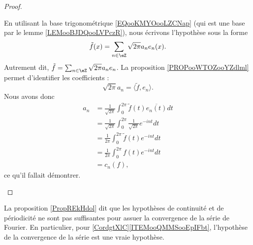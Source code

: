 \begin{proof}
\begin{subproof}
            En utilisant la base trigonométrique \eqref{EQooKMYOooLZCNap} (qui est une base par le lemme \ref{LEMooBJDQooLVPczR}), nous écrivons l'hypothèse sous la forme
            \begin{equation}
                \tilde f(x)=\sum_{n\in \eZ}\sqrt{ 2\pi }a_ne_n(x).
            \end{equation}
            Autrement dit, \( \tilde f=\sum_{n\in \eZ}\sqrt{ 2\pi }a_ne_n\). La proposition \ref{PROPooWTOZooYZdlml} permet d'identifier les coefficients : 
            \begin{equation}
                \sqrt{ 2\pi }a_n=\langle \tilde f, e_n\rangle .
            \end{equation}
            Nous avons donc
            \begin{subequations}
                \begin{align}
                    a_n&=\frac{1}{ \sqrt{ 2\pi } }\int_0^{2\pi}\tilde f(t)\overline{ e_n(t) }dt\\
                    &=\frac{1}{ \sqrt{ 2\pi } }\int_0^{2\pi}\frac{1}{ \sqrt{ 2\pi } } e^{-int}dt\\
                    &=\frac{1}{ 2\pi }\int_0^{2\pi}\tilde f(t) e^{-int}dt\\
                    &=\frac{1}{ 2\pi }\int_0^{2\pi}f(t) e^{-int}dt\\
                    &=c_n(f),
                \end{align}
            \end{subequations}
            ce qu'il fallait démontrer.
    \end{subproof}
\end{proof}

\begin{normaltext}
    La proposition \ref{PropREkHdol} dit que les hypothèses de continuité et de périodicité ne sont pas suffisantes pour assuer la convergence de la série de Fourier. En particulier, pour \ref{CordgtXlC}\ref{ITEMooQMMSooEpIFbt}, l'hypothèse de la convergence de la série est une vraie hypothèse.
\end{normaltext}

